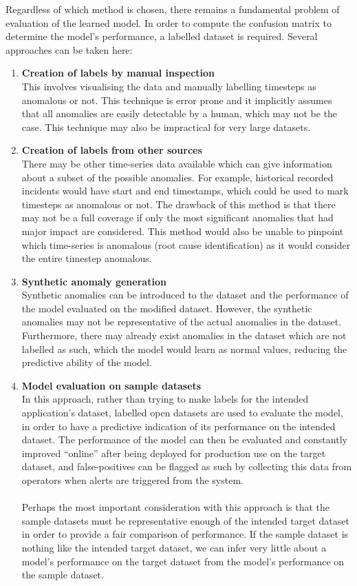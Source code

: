 \documentclass{mpaper}
\begin{document}
Regardless of which method is chosen, there remains a fundamental problem of evaluation
of the learned model. In order to compute the confusion matrix to determine the model's
performance, a labelled dataset is required. Several approaches can be taken here:
\begin{enumerate}
	\item \textbf{Creation of labels by manual inspection} \\ This involves visualising the data and manually labelling timesteps as anomalous or not. This technique is error prone and it implicitly assumes that all anomalies are easily detectable by a human, which may not be the case. This technique may also be impractical for very large datasets.
	\item \textbf{Creation of labels from other sources} \\ There may be other time-series data available which can give information about a subset of the possible anomalies. For example, historical recorded incidents would have start and end timestamps, which could be used to mark timesteps as anomalous or not. The drawback of this method is that there may not be a full coverage if only the most significant anomalies that had major impact are considered. This method would also be unable to pinpoint which time-series is anomalous (root cause identification) as it would consider the entire timestep anomalous.
	\item \textbf{Synthetic anomaly generation} \\ Synthetic anomalies can be introduced to the dataset and the performance of the model evaluated on the modified dataset. However, the synthetic anomalies may not be representative of the actual anomalies in the dataset. Furthermore, there may already exist anomalies in the dataset which are not labelled as such, which the model would learn as normal values, reducing the predictive ability of the model.
	\item \textbf{Model evaluation on sample datasets} \\ In this approach, rather than trying to make labels for the intended application's dataset, labelled open datasets are used to evaluate the model, in order to have a predictive indication of its performance on the intended dataset. The performance of the model can then be evaluated and constantly improved ``online'' after being deployed for production use on the target dataset, and false-positives can be flagged as such by collecting this data from operators when alerts are triggered from the system.\\ 
		\\
		Perhaps the most important consideration with this approach is that the sample datasets must be representative enough of the intended target dataset in order to provide a fair comparison of performance. If the sample dataset is nothing like the intended target dataset, we can infer very little about a model's performance on the target dataset from the model's performance on the sample dataset.
\end{enumerate}
\end{document}
